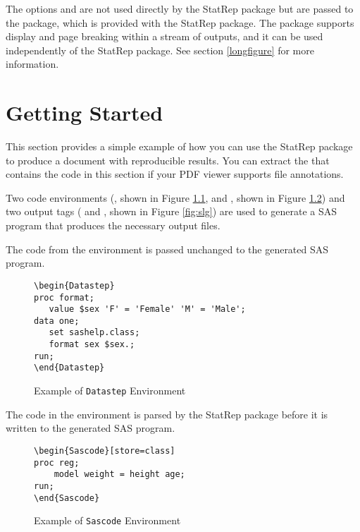 \documentclass[article,oneside]{memoir}
\newcommand*{\StatRep}{\textsf{StatRep}\xspace}
\begin{document}
     The options  and  are not used directly by the \StatRep
     package but are passed to the  package, which
     is provided with the \StatRep package.
    The  package
    supports display and page breaking within a stream of outputs, and it can be
    used independently of the \StatRep package. See section \ref{longfigure} for
more information.

\chapter{Getting Started}\label{gs}

This section provides a simple example of how you can use the \StatRep package
to produce a document with reproducible results. You can extract the
 that
contains the code in this section if your PDF viewer supports file annotations.

  Two code environments
  (, shown in Figure \ref{fig:d1}, and
  , shown in Figure \ref{fig:s1})
  and two output tags
  ( and , shown in Figure \ref{fig:slg})
  are used to generate a SAS program that produces
  the necessary output files.

  The code from the  environment is passed unchanged to the
  generated SAS program.
\begin{figure}[H]
\begin{snugshade}
\begin{verbatim}
\begin{Datastep}
proc format;
   value $sex 'F' = 'Female' 'M' = 'Male';
data one;
   set sashelp.class;
   format sex $sex.;
run;
\end{Datastep}
\end{verbatim}
\end{snugshade}
\caption{Example of \texttt{Datastep} Environment}\label{fig:d1}
\end{figure}

  The code in the  environment is parsed by the \StatRep package before it is
  written to the generated SAS program.

\begin{figure}[H]
\begin{snugshade}
\begin{verbatim}
\begin{Sascode}[store=class]
proc reg;
    model weight = height age;
run;
\end{Sascode}
\end{verbatim}
\end{snugshade}
\caption{Example of \texttt{Sascode} Environment}\label{fig:s1}
\end{figure}
\end{document}
